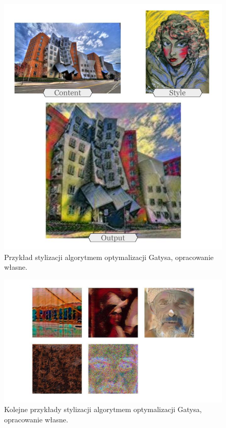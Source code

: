 \documentclass[12pt]{article}
\begin{document}
\begin{figure}[H]
    \centering
    \includegraphics[width=\textwidth]{u13.png}
    \caption{Przykład stylizacji algorytmem optymalizacji Gatysa, opracowanie własne.}
    \label{fig:10:1}
\end{figure}

\begin{figure}[H]
    \centering
    \includegraphics[width=\textwidth]{u14.png}
    \caption{Kolejne przykłady stylizacji algorytmem optymalizacji Gatysa, opracowanie własne.}
    \label{fig:10:2}
\end{figure}
\end{document}

